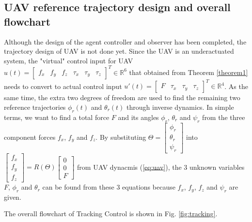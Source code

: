\documentclass{ieeeaccess}
\begin{document}
\subsection{UAV reference trajectory design and overall flowchart}
Although the design of the agent controller and observer has been completed, the trajectory design of UAV is not done yet. Since the UAV is an underactuated system, the "virtual" control input for UAV $u(t)=\begin{bmatrix}
    f_x & f_y & f_z & \tau_x & \tau_y & \tau_z 
\end{bmatrix}^T\in\mathbb{R}^6$ that obtained from Theorem \ref{theorem1} needs to convert to actual control input $u'(t)=\begin{bmatrix}
    F & \tau_x & \tau_y & \tau_z 
\end{bmatrix}^T\in\mathbb{R}^4$. As the same time, the extra two degrees of freedom are used to find the remaining two reference trajectories $\phi_r(t)$ and $\theta_r(t)$ through inverse dynamics. In simple terms, we want to find a total force $F$ and its angles $\phi_r$, $\theta_r$ and $\psi_r$ from the three component forces $f_x$, $f_y$ and $f_z$. By substituting $\Theta=\begin{bmatrix}
    \phi_r \\ \theta_r \\ \psi_r
\end{bmatrix}$ into $\begin{bmatrix}
        f_x \\ f_y \\ f_z
    \end{bmatrix} = R(\Theta)\begin{bmatrix}
        0 \\ 0 \\ F
\end{bmatrix} $ from UAV dynacmis (\ref{eq:uav}), the 3 unknown variables $F$, $\phi_r$ and $\theta_r$ can be found from these 3 equations because $f_x$, $f_y$, $f_z$ and $\psi_r$ are given.

The overall flowchart of Tracking Control is shown in Fig. \ref{fig:tracking}.
\end{document}
